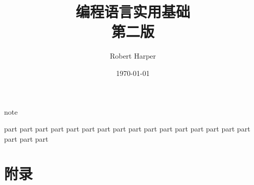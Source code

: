 \documentclass{ctexbook}
\title{{\Huge\textbf{编程语言实用基础}} \\第二版}
\author{Robert Harper}
\date{\today}
\begin{document}
\frontmatter
\maketitle

{note}

\setcounter{tocdepth}{1}
\tableofcontents

\newpage
\mainmatter

{part}
{part}
{part}
{part}
{part}
{part}
{part}
{part}
{part}
{part}
{part}
{part}
{part}
{part}
{part}
{part}
{part}
{part}
{part}

\backmatter
\part{附录}
\appendix
\printglossary[title=术语]
\end{document}
